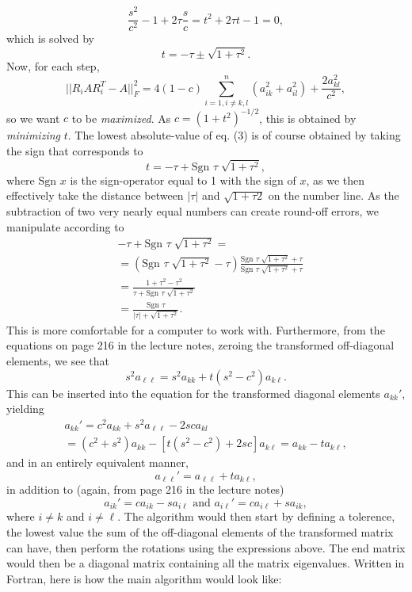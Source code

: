 \documentclass[a4paper,twocolumn,nofootinbib]{revtex4-1}
\begin{document}
\[ \frac{s^2}{c^2}-1 + 2\tau \frac{s}{c}= t^2+ 2\tau t-1=0,\]
which is solved by \begin{equation} t = -\tau \pm \sqrt{1+\tau^2}.\end{equation} Now, for each step, 
\[ ||R_iAR_i^T -A||_F^2=4(1-c)\sum_{i=1,i\ne k,l}^n(a_{ik}^2+a_{il}^2) +\frac{2a_{kl}^2}{c^2}, \]
so we want $c$ to be \textit{maximized}. As $c=(1+t^2)^{-1/2}$, this is obtained by \textit{minimizing} $t$. The lowest absolute-value of eq. (3) is of course obtained by taking the sign that corresponds to
\begin{equation}\label{tsol}
t = -\tau +\text{Sgn }\tau \; \sqrt{1+\tau^2},
\end{equation}
where $\text{Sgn }x$ is the sign-operator equal to 1 with the sign of $x$, as we then effectively take the distance between $|\tau|$ and $\sqrt{1+\tau 2}$ on the number line. As the subtraction of two very nearly equal numbers can create round-off errors, we manipulate according to
\begin{align*}
&-\tau +\text{Sgn }\tau \; \sqrt{1+\tau^2} =\\
&= (\text{Sgn }\tau \; \sqrt{1+\tau^2} -\tau)\frac{\text{Sgn }\tau \; \sqrt{1+\tau^2} + \tau}{\text{Sgn }\tau \; \sqrt{1+\tau^2}+\tau}\\
&=\frac{1+\tau^2-\tau^2}{\tau+\text{Sgn }\tau \; \sqrt{1+\tau^2}}\\
&= \frac{\text{Sgn }\tau }{|\tau| +\sqrt{1+\tau^2}}.
\end{align*}
This is more comfortable for a computer to work with. Furthermore, from the equations on page 216 in the lecture notes, zeroing the transformed off-diagonal elements, we see that
\[s^2 a_{\ell \ell} = s^2 a_{kk}+t(s^2-c^2)a_{k \ell}. \] This can be inserted into the equation for the transformed diagonal elements $a_{kk}'$, yielding
\begin{multline*} 
a_{kk}' = c^2a_{kk} +s^2a_{\ell \ell} - 2sc a_{kl}  \\
=(c^2+s^2)a_{kk}-[t(s^2-c^2)+2sc]a_{k\ell}=a_{kk}-ta_{k\ell},
\end{multline*}
and in an entirely equivalent manner,
\[ a_{\ell \ell}' = a_{\ell \ell}+ ta_{k\ell}, \] in addition to (again, from page 216 in the lecture notes)
\[a_{ik}' = ca_{ik}-sa_{i\ell} \text{ and } a_{i\ell}' = c a_{i\ell} + s a_{ik},\] where $i\neq k$ and $i\neq \ell$.
The algorithm would then start by defining a tolerence, the lowest value the sum of the off-diagonal elements of the transformed matrix can have, then perform the rotations using the expressions above. The end matrix would then be a diagonal matrix containing all the matrix eigenvalues. Written in Fortran, here is how the main algorithm would look like:
\end{document}
